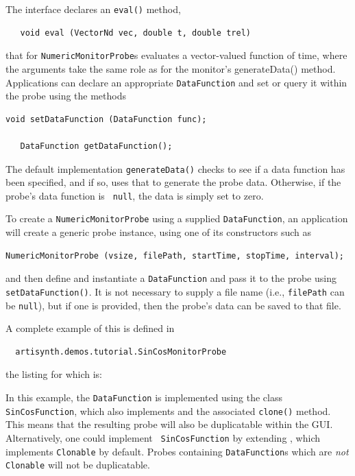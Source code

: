 The  interface
declares an {\tt eval()} method,
%
\begin{verbatim}
   void eval (VectorNd vec, double t, double trel)
\end{verbatim}
%
that for 
{\tt NumericMonitorProbe}s
evaluates a vector-valued function of time,
where the arguments take the same role as for the monitor's %
{generateData()}
method. Applications can declare an appropriate {\tt DataFunction} and
set or query it within the probe using the methods
\begin{lstlisting}[]
   void setDataFunction (DataFunction func);

   DataFunction getDataFunction();
\end{lstlisting}
%
The default implementation {\tt generateData()} checks to see
if a data function has been specified, and if so, uses that to
generate the probe data. Otherwise, if the probe's data function is {\tt
null}, the data is simply set to zero.

To create a {\tt NumericMonitorProbe} using a supplied {\tt DataFunction},
an application will create a generic probe instance, using one
of its constructors such as 
%
\begin{lstlisting}[]
   NumericMonitorProbe (vsize, filePath, startTime, stopTime, interval);
\end{lstlisting}
%
and then define and instantiate a {\tt DataFunction} and pass it to
the probe using {\tt setDataFunction()}. It is not necessary to supply
a file name (i.e., {\tt filePath} can be {\tt null}), but if one is
provided, then the probe's data can be saved to that file.

A complete example
of this is defined in
%
\begin{verbatim}
  artisynth.demos.tutorial.SinCosMonitorProbe
\end{verbatim}
%
the listing for which is:

\lstset{numbers=left}

\lstset{numbers=none}

In this example, the {\tt DataFunction} is implemented using the class
{\tt SinCosFunction}, which also implements
 and the associated {\tt clone()}
method. This means that the resulting probe will also be duplicatable
within the GUI. Alternatively, one could implement {\tt
SinCosFunction} by extending
, which implements
{\tt Clonable} by default. Probes containing {\tt DataFunction}s
which are {\it not} {\tt Clonable} will not be duplicatable.

